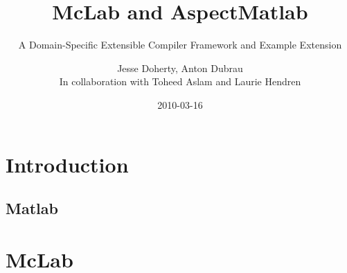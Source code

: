 \documentclass{beamer}
\begin{document}
\title{McLab and AspectMatlab}
\subtitle{\small{A Domain-Specific Extensible Compiler Framework and
    Example Extension}}

\author{Jesse Doherty, Anton Dubrau\\In collaboration with Toheed
  Aslam and Laurie Hendren} 
\date{2010-03-16} 


\small
{}

\frame{\titlepage} 




\section{Introduction} %

\subsection*{Matlab} %

\section{McLab} %

\end{document}
